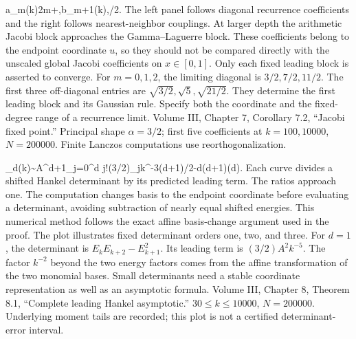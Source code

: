 {a_m(k)\to2m+\alpha,\qquad b_{m+1}(k)\to{},\qquad {}/2.}
{The left panel follows diagonal recurrence coefficients and the right follows nearest-neighbor couplings. At larger depth the arithmetic Jacobi block approaches the Gamma--Laguerre block. These coefficients belong to the endpoint coordinate $u$, so they should not be compared directly with the unscaled global Jacobi coefficients on $x\in[0,1]$. Only each fixed leading block is asserted to converge.}
{For $m=0,1,2$, the limiting diagonal is $3/2,7/2,11/2$. The first three off-diagonal entries are $\sqrt{3/2},\sqrt5,\sqrt{21/2}$. They determine the first leading block and its Gaussian rule.}
{Specify both the coordinate and the fixed-degree range of a recurrence limit.}
{Volume III, Chapter 7, Corollary 7.2, ``Jacobi fixed point.'' Principal shape $\alpha=3/2$; first five coefficients at $k=100,10000$, $N=200000$. Finite Lanczos computations use reorthogonalization.}

{\Delta_d(k)\sim A^{d+1}\!\prod_{j=0}^d j!(3/2)_j\;k^{-3(d+1)/2-d(d+1)}\quad(d).}
{Each curve divides a shifted Hankel determinant by its predicted leading term. The ratios approach one. The computation changes basis to the endpoint coordinate before evaluating a determinant, avoiding subtraction of nearly equal shifted energies. This numerical method follows the exact affine basis-change argument used in the proof. The plot illustrates fixed determinant orders one, two, and three.}
{For $d=1$, the determinant is $E_kE_{k+2}-E_{k+1}^2$. Its leading term is $(3/2)A^2k^{-5}$. The factor $k^{-2}$ beyond the two energy factors comes from the affine transformation of the two monomial bases.}
{Small determinants need a stable coordinate representation as well as an asymptotic formula.}
{Volume III, Chapter 8, Theorem 8.1, ``Complete leading Hankel asymptotic.'' $30\le k\le10000$, $N=200000$. Underlying moment tails are recorded; this plot is not a certified determinant-error interval.}

